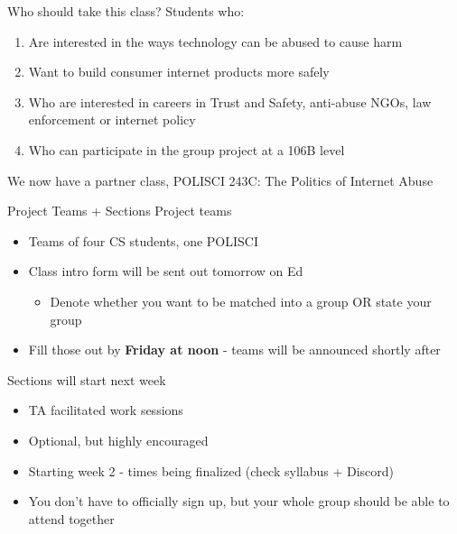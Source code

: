 \documentclass[nobackground,dvipsnames,table]{beamer}
\begin{document}
\begin{frame}{Who should take this class?}
    Students who:
    \begin{enumerate}
        \item Are interested in the ways technology can be abused to cause harm
        \item Want to build consumer internet products more safely
        \item Who are interested in careers in Trust and Safety, anti-abuse NGOs, law enforcement or internet policy
        \item Who can participate in the group project at a 106B level
    \end{enumerate}

    We now have a partner class, POLISCI 243C: The Politics of Internet Abuse
\end{frame}

\begin{frame}{Project Teams + Sections}
    Project teams
    \begin{itemize}
        \small
        \item Teams of four CS students, one POLISCI
        \item Class intro form will be sent out tomorrow on Ed
        \begin{itemize}
            \item Denote whether you want to be matched into a group OR state your group
        \end{itemize}
        \item Fill those out by \textbf{Friday at noon} - teams will be announced shortly after
    \end{itemize}
    
    Sections will start next week
    \begin{itemize}
        \small
        \item TA facilitated work sessions
        \item Optional, but highly encouraged 
        \item Starting week 2 - times being finalized (check syllabus + Discord)
        \item You don't have to officially sign up, but your whole group should be able to attend together
    \end{itemize}
\end{frame}
\end{document}
